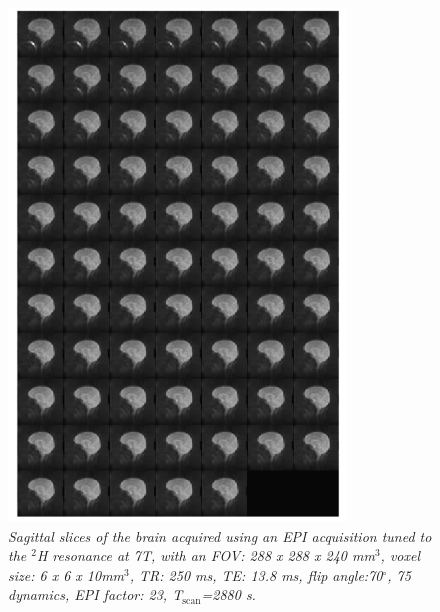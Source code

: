 \begin{figure}[H]
    \centering
    \includegraphics[width=0.8\textwidth]{Figures/D2O/EPI.png}
    \caption{\textit{Sagittal slices of the brain acquired using an \ac{EPI} acquisition tuned to the $^2$H resonance at 7T, with an \ac{FOV}: 288 x 288 x 240 mm$^3$, voxel size: 6 x 6 x 10mm$^3$, \ac{TR}: 250 ms, TE: 13.8 ms, flip angle:70$^\circ$, 75 dynamics, \ac{EPI} factor: 23, T$_\textrm{scan}$=2880 s.}}
    \label{fig:D2O:EPI}
\end{figure}